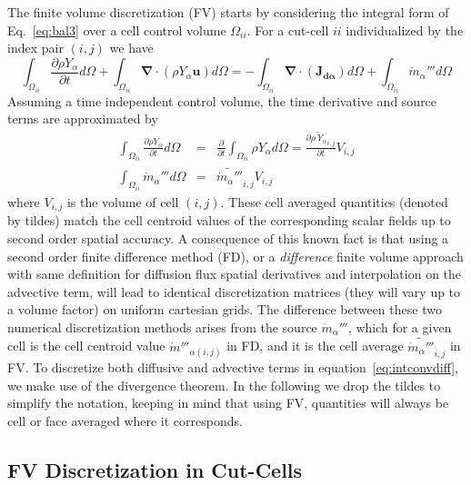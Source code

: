 The finite volume discretization (FV) starts by considering the integral form of Eq.~\eqref{eq:bal3} over a cell control volume $\Omega_{ii}$. For a cut-cell
$ii$ individualized by the index pair $(i,j)$ we have
%
\begin{equation}
 \int_{\Omega_{ii}} {\frac{\partial \rho Y_\alpha}{\partial t}} d \Omega + \int_{\Omega_{ii}} { \boldsymbol{\nabla} \cdot  \left(  \rho Y_\alpha \mathbf{u} \right)
      } d \Omega  = -\int_{\Omega_{ii}} { \boldsymbol{\nabla} \cdot \left(  \mathbf{J_{d \alpha}}  \right)  } d \Omega + \int_{\Omega_{ii}} { \dot{m}_\alpha''' } d \Omega \label{eq:intconvdiff}
\end{equation}
%
Assuming a time independent control volume, the time derivative and source terms are approximated by
%
\begin{eqnarray}
  \int_{\Omega_{ii}} {\frac{\partial \rho Y_\alpha}{\partial t}} d \Omega & = & \frac{\partial}{\partial t} \int_{\Omega_{ii}} {\rho Y_\alpha} d \Omega
  = \frac{\partial \widetilde{\rho \: Y_\alpha }_{i,j}}{\partial t} V_{i,j} \\
  \int_{\Omega_{ii}} { \dot{m}_\alpha''' } d \Omega & = & \widetilde{ \dot{m}_\alpha''' }_{i,j} V_{i,j} \label{eq:intcons}
\end{eqnarray}
%
where $V_{i,j}$ is the volume of cell $(i,j)$. These cell averaged quantities (denoted by tildes) match the cell centroid values of the corresponding scalar fields up to second order spatial accuracy. A consequence of this known fact is that using a second order finite difference method (FD), or a \textit{difference} finite volume approach with same definition
 for diffusion flux spatial derivatives and interpolation on the advective term, will lead to identical discretization matrices (they will vary up to a volume factor) on uniform cartesian grids. The difference between these two numerical discretization methods arises from the source $\dot{m}_\alpha''' $, which for a given cell is the cell centroid value $\dot{m}'''_{\alpha (i,j)}$ in FD, and it is the cell average $ \widetilde{ \dot{m}_\alpha''' }_{i,j}$ in FV. To discretize both diffusive and advective terms in equation~\eqref{eq:intconvdiff}, we make use of the divergence theorem. In the following we drop the tildes to simplify the notation, keeping in mind that using FV, quantities will always be cell or face averaged where it corresponds.


\subsection{FV Discretization in Cut-Cells} \label{sec:cc}

